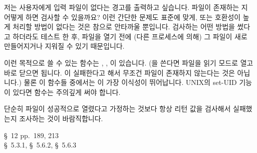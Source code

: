 \begin{faq}
	저는 사용자에게 입력 파일이 없다는 경고를 출력하고 싶습니다.
	파일이 존재하는 지 어떻게 하면 검사할 수 있을까요?
\A
	이런 간단한 문제도 표준에 맞게, 또는 호환성이 높게 처리할 방법이
	없다는 것은 참으로 안타까울 뿐입니다.
	검사하는 어떤 방법을 썼다고 하더라도 테스트 한 후, 파일을 열기 전에
	(다른 프로세스에 의해) 그 파일이 새로 만들어지거나 지워질 수
	있기 때문입니다.

	이런 목적으로 쓸 수 있는 함수는 , ,
	이 있습니다.  (을 쓴다면 파일을 읽기 모드로
	열고 바로 닫으면 됩니다.  이 실패한다고 해서 무조건
	파일이 존재하지 않는다는 것은 아닙니다.)
	물론 이 함수들 중에서는 이 가장 이식성이 뛰어납니다.
	UNIX의 set-UID 기능이 있다면  함수는 주의깊게 
	써야 합니다.

	단순히 파일이 성공적으로 열렸다고 가정하는 것보다 항상 리턴 값을
	검사해서 실패했는지 조사하는 것이 바람직합니다.


\R
	\cite{pcs} \S\ 12 pp.\ 189, 213 \\
	\cite{posix} \S\ 5.3.1,	\S\ 5.6.2, \S\ 5.6.3
\end{faq}

